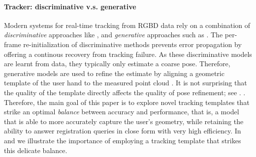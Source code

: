 \paragraph{Tracker: discriminative v.s. generative}
Modern systems for real-time tracking from RGBD data  \cite{sridhar2015fast,sharp2015accurate} rely on a combination of \emph{discriminative} approaches like \cite{oberweger2015feedback}, and \emph{generative} approaches such as \cite{tagliasacchi2015robust}. The per-frame re-initialization of discriminative methods prevents error propagation by offering a continous recovery from tracking failure. As these discriminative models are learnt from data, they typically only estimate a coarse pose. Therefore, generative models are used to refine the estimate by aligning a geometric template of the user hand to the measured point cloud . It is not surprising that the quality of the template directly affects the quality of pose refinement; see . 
.
% 
Therefore, the main goal of this paper is to explore novel tracking templates that strike an optimal \emph{balance} between accuracy and performance, that is, a model that is able to more accurately capture the user's geometry, while retaining the ability to answer registration queries in close form with very high efficiency. In  and  we illustrate the importance of employing a tracking template that strikes this delicate balance.



